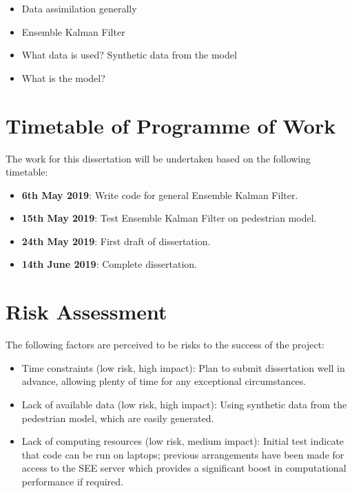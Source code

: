 \documentclass[12pt, twoside, a4paper]{article}
\begin{document}
\begin{itemize}
    \item Data assimilation generally
    \item Ensemble Kalman Filter
    \item What data is used? Synthetic data from the model
    \item What is the model?
\end{itemize}

\section{Timetable of Programme of Work}\label{sec:timetable}


The work for this dissertation will be undertaken based on the following
timetable:
\begin{itemize}
    \item \textbf{6th May 2019}: Write code for general Ensemble Kalman Filter.
    \item \textbf{15th May 2019}: Test Ensemble Kalman Filter on pedestrian model.
    \item \textbf{24th May 2019}: First draft of dissertation.
    \item \textbf{14th June 2019}: Complete dissertation.
\end{itemize}

\section{Risk Assessment}\label{sec:risk_ass}

The following factors are perceived to be risks to the success of the project:
\begin{itemize}
    \item Time constraints (low risk, high impact): Plan to submit dissertation well in
        advance, allowing plenty of time for any exceptional circumstances.
    \item Lack of available data (low risk, high impact): Using synthetic data
        from the pedestrian model, which are easily generated.
    \item Lack of computing resources (low risk, medium impact): Initial test
        indicate that code can be run on laptops; previous arrangements have
        been made for access to the SEE server which provides a significant
        boost in computational performance if required.
\end{itemize}




\end{document}
